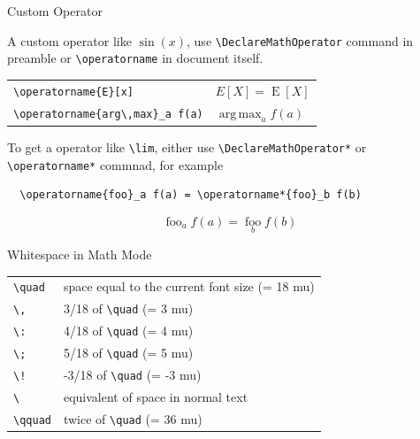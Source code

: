 \documentclass[10pt]{beamer}
\begin{document}
\begin{frame}[fragile]{Custom Operator}
\begin{tcolorbox}[width=\textwidth, colframe=red]
A custom operator like $\sin(x)$, use \verb|\DeclareMathOperator| command in preamble or 
\verb|\operatorname| in document itself. 
\end{tcolorbox}

\begin{tabular}{ll}
\verb|\operatorname{E}[x]|             & $E[X] = \operatorname{E}[X]$ \\[1em]
\verb|\operatorname{arg\,max}_a f(a)|  & $\operatorname{arg\,max}_a f(a)$ \\[1em]
\end{tabular}

\begin{tcolorbox}[width=\textwidth, colframe=red]
To get a operator like \verb|\lim|, either use \verb|\DeclareMathOperator*| or \verb|\operatorname*|
commnad, for example
\end{tcolorbox}

\begin{verbatim}
  \operatorname{foo}_a f(a) = \operatorname*{foo}_b f(b)
\end{verbatim}
$$\operatorname{foo}_a f(a) = \operatorname*{foo}_b f(b)$$
\end{frame}

\begin{frame}[fragile]{Whitespace in Math Mode}
\begin{tabular}{ll}
\verb|\quad| &	space equal to the current font size (= 18 mu) \\[1em]
\verb|\,|    &	3/18 of \verb|\quad| (= 3 mu)\\[1em]
\verb|\:|    &	4/18 of \verb|\quad| (= 4 mu)\\[1em]
\verb|\;|	 &  5/18 of \verb|\quad| (= 5 mu)\\[1em]
\verb|\!| 	 &  -3/18 of \verb|\quad| (= -3 mu)\\[1em]
\verb|\ |    &	equivalent of space in normal text\\[1em]
\verb|\qquad|&	twice of \verb|\quad| (= 36 mu)
\end{tabular}
\end{frame}
\end{document}
